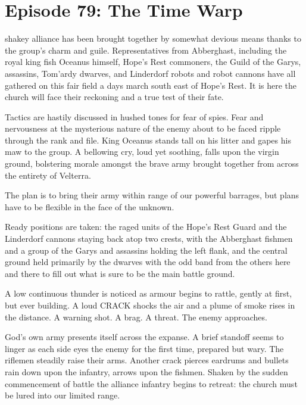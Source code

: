 \section{Episode 79: The Time Warp}

\medskip

 shakey alliance has been brought together by somewhat devious means thanks to the group's charm and guile. Representatives from Abberghast, including the royal king fish Oceanus himself, Hope's Rest commoners, the Guild of the Garys, assassins, Tom'ardy dwarves, and Linderdorf robots and robot cannons have all gathered on this fair field a days march south east of Hope's Rest. It is here the church will face their reckoning and a true test of their fate.\medskip

Tactics are hastily discussed in hushed tones for fear of spies. Fear and nervousness at the mysterious nature of the enemy about to be faced ripple through the rank and file. King Oceanus stands tall on his litter and gapes his maw to the group. A bellowing cry, loud yet soothing, falls upon the virgin ground, bolstering morale amongst the brave army brought together from across the entirety of Velterra.\medskip

The plan is to bring their army within range of our powerful barrages, but plans have to be flexible in the face of the unknown.\medskip

Ready positions are taken: the raged units of the Hope's Rest Guard and the Linderdorf cannons staying back atop two crests, with the Abberghast fishmen and a group of the Garys and assassins holding the left flank, and the central ground held primarily by the dwarves with the odd band from the others here and there to fill out what is sure to be the main battle ground.\medskip

A low continuous thunder is noticed as armour begins to rattle, gently at first, but ever building. A loud CRACK shocks the air and a plume of smoke rises in the distance. A warning shot. A brag. A threat. The enemy approaches.\medskip

God's own army presents itself across the expanse. A brief standoff seems to linger as each side eyes the enemy for the first time, prepared but wary. The riflemen steadily raise their arms. Another crack pierces eardrums and bullets rain down upon the infantry, arrows upon the fishmen. Shaken by the sudden commencement of battle the alliance infantry begins to retreat: the church must be lured into our limited range.\medskip

